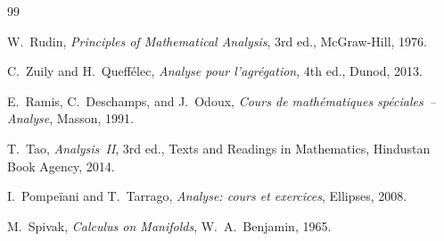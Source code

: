 \documentclass[12pt,a4paper]{book}
\theoremstyle{definition}
\begin{document}
\begin{thebibliography}{99}

W.~Rudin,
\emph{Principles of Mathematical Analysis},
3rd ed., McGraw-Hill, 1976.

C.~Zuily and H.~Queff\'elec,
\emph{Analyse pour l'agr\'egation},
4th ed., Dunod, 2013.

E.~Ramis, C.~Deschamps, and J.~Odoux,
\emph{Cours de math\'ematiques sp\'eciales~-- Analyse},
Masson, 1991.

T.~Tao,
\emph{Analysis~II},
3rd ed., Texts and Readings in Mathematics, Hindustan Book Agency, 2014.

I.~Pompe\"iani and T.~Tarrago,
\emph{Analyse: cours et exercices},
Ellipses, 2008.

M.~Spivak,
\emph{Calculus on Manifolds},
W.~A.~Benjamin, 1965.

\end{thebibliography}



\printindex
\end{document}
